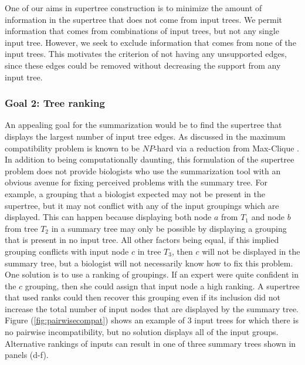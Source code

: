 \documentclass[fleqn,12pt,lineno,english]{wlpeerj}
\begin{document}
One of our aims in supertree construction is to minimize the amount
of information in the supertree that does not come from input trees.
We permit information that comes from combinations of input trees,
but not any single input tree. However, we seek to exclude information
that comes from none of the input trees. This motivates the criterion
of not having any unsupported edges, since these edges could be removed
without decreasing the support from any input tree.

\subsubsection{Goal 2: Tree ranking}

An appealing goal for the summarization would be to find the supertree
that displays the largest number of input tree edges. As discussed
in \citet[pages 92 and 131;][]{HusonRS2010} the maximum compatibility
problem is known to be $NP$-hard via a reduction from Max-Clique \citep{Karp1972}.
In addition to being computationally daunting, this formulation of
the supertree problem does not provide biologists who use the summarization
tool with an obvious avenue for fixing perceived problems with the
summary tree. For example, a grouping that a biologist expected may
not be present in the supertree, but it may not conflict with any
of the input groupings which are displayed. This can happen because
displaying both node $a$ from $T_{1}$ and node $b$ from tree $T_{2}$
in a summary tree may only be possible by displaying a grouping that
is present in no input tree. All other factors being equal, if this
implied grouping conflicts with input node $c$ in tree $T_{3}$,
then $c$ will not be displayed in the summary tree, but a biologist
will not necessarily know how to fix this problem. One solution is
to use a ranking of groupings. If an expert were quite confident in
the $c$ grouping, then she could assign that input node a high ranking.
A supertree that used ranks could then recover this grouping even
if its inclusion did not increase the total number of input nodes
that are displayed by the summary tree. Figure (\ref{fig:pairwisecompat})
shows an example of 3 input trees for which there is no pairwise incompatibility,
but no solution displays all of the input groups. Alternative rankings
of inputs can result in one of three summary trees shown in panels
(d-f). 
\end{document}
